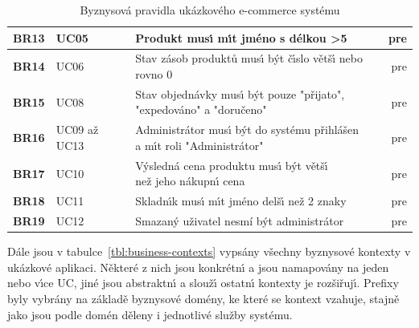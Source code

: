 \begin{table}
\begin{tabular}{ l l l r }
        \textbf{BR13} & UC05 & Produkt mus\'{\i} m\'{\i}t jméno s délkou >5 & pre \\ \hline
        \textbf{BR14} & UC06 & Stav zásob produktů mus\'{\i} b\'yt č\'{\i}slo větš\'{\i} nebo rovno 0 & pre \\ \hline
        \textbf{BR15} & UC08 & \makecell[l]{Stav objednávky mus\'{\i} b\'yt pouze "přijato", \\ "expedováno" a "doručeno"} & pre \\ \hline
        \textbf{BR16} & UC09 až UC13 & \makecell[l]{Administrátor mus\'{\i} b\'yt do systému přihlášen \\ a m\'{\i}t roli "Administrátor"} & pre \\ \hline
        \textbf{BR17} & UC10 & \makecell[l]{V\'ysledná cena produktu mus\'{\i} b\'yt větš\'{\i} \\ než jeho nákupn\'{\i} cena} & pre \\ \hline
        \textbf{BR18} & UC11 & Skladn\'{\i}k mus\'{\i} m\'{\i}t jméno delš\'{\i} než 2 znaky & pre \\ \hline
        \textbf{BR19} & UC12 & Smazaný uživatel nesmí být administrátor & pre \\ \hline
        \hline
    \end{tabular}
    \caption{Byznysová pravidla ukázkového e-commerce systému}
    \label{tbl:business-rules}
\end{table}

Dále jsou v tabulce~\ref{tbl:business-contexts} vypsány všechny byznysové kontexty v ukázkové aplikaci.
Některé z nich jsou konkrétn\'{\i} a jsou namapovány na jeden nebo v\'{\i}ce \gls{UC},
jiné jsou abstraktn\'{\i} a slouž\'{\i} ostatn\'{\i} kontexty je rozšiřuj\'{\i}.
Prefixy byly vybrány na základě byznysové domény, ke které se kontext vzahuje, stajně jako
jsou podle domén děleny i jednotlivé služby systému.

